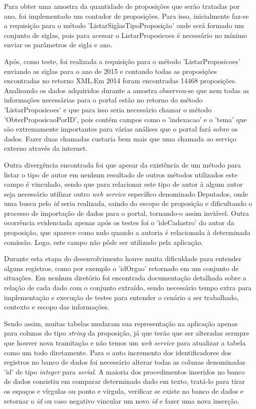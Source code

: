 \documentclass[
	12pt,				%
	openright,			%
	twoside,			%
	a4paper,			%
	english,			%
	french,				%
	spanish,			%
	brazil				%
	]{abntex2}
\begin{document}
Para obter uma amostra da quantidade de proposições que serão tratadas por ano, foi implementado um contador de proposições. 
Para isso, inicialmente faz-se a requisição para o método 'ListarSiglasTipoProposição' onde será formado um conjunto de siglas, 
pois para acessar o ListarProposicoes é necessário no mínimo enviar os parâmetros de sigla e ano.

Após, como teste, foi realizada a requisição para o método 'ListarProposicoes' enviando as siglas para o ano de 2015 e contando
todas as proposições encontradas no retorno XML.Em 2014 foram encontradas 14468 proposições. Analisando os dados adquiridos durante a 
amostra observou-se que nem todas as informações necessárias para o portal estão no retorno do método 'ListarProposicoes' e que para 
isso seria necessário chamar o método 'ObterProposicaoPorID', pois contém campos como o 'indexacao' e o 'tema' que são 
extremamente importantes para várias análises que o portal fará sobre os dados. Fazer duas chamadas custaria bem mais
que uma chamada ao serviço externo através da internet. 

Outra divergência encontrada foi que apesar da existência de um método para listar o tipo de autor em nenhum 
resultado de outros métodos utilizados este campo é vinculado, sendo que para relacionar este tipo de autor à 
algum autor seja necessário utilizar outro \emph{web service} específico denominado Deputados, onde uma busca pelo \emph{id} 
seria realizada, saindo do escopo de proposição e dificultando o processo de importação de dados para o portal, tornando-o 
assim inviável. Outra ocorrência evidenciada apenas após os testes foi o 'ideCadastro' do autor da proposição, 
que aparece como nulo quando a autoria é relacionada à determinada comissão. Logo, este campo não pôde ser utilizado pela aplicação.

Durante esta etapa do desenvolvimento houve muita dificuldade para entender alguns registros, como por exemplo
o 'idOrgao' retornado em um conjunto de situações. Em nenhum diretório foi encontrada documentação detalhada sobre a 
relação de cada dado com o conjunto extraído, sendo necessário tempo extra para implementação e execução de testes para entender 
o cenário a ser trabalhado, contexto e escopo das informações.

Sendo assim, muitas tabelas mudaram sua representação na aplicação apenas para colunas do tipo \emph{string} da proposição,
já que terão que ser alteradas sermpre que houver nova tramitação e não temos um \emph{web service} para atualizar a tabela como um 
todo diretamente. Para o auto incremento dos identificadores dos registros no banco de dados foi necessário alterar todas as colunas denominadas 'id' 
de tipo \emph{integer} para \emph{serial}. A maioria dos procedimentos inseridos no banco de dados consistiu em comparar determinado dado em texto, tratá-lo
para tirar os espaços e vírgulas ou ponto e vírgula, verificar se existe no banco de dados e retornar o \emph{id} ou caso negativo 
vincular um novo \emph{id} e fazer uma nova inserção.
\end{document}
